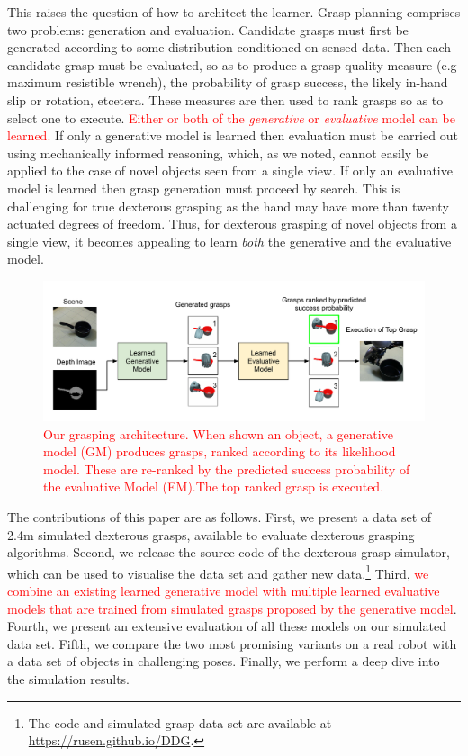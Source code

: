 This raises the question of how to architect the learner. Grasp planning comprises two problems: generation and evaluation. Candidate grasps must first be generated according to some distribution conditioned on sensed data. Then each candidate grasp must be evaluated, so as to produce a grasp quality measure (e.g maximum resistible wrench), the probability of grasp success, the likely in-hand slip or rotation, etcetera. These measures are then used to rank grasps so as to select one to execute. \textcolor{red}{Either or both of the {\em generative} or {\em evaluative} model can be learned.} If only a generative model is learned then evaluation must be carried out using mechanically informed reasoning, which, as we noted, cannot easily be applied to the case of novel objects seen from a single view. If only an evaluative model is learned then grasp generation must proceed by search. This is challenging for true dexterous grasping as the hand may have more than twenty actuated degrees of freedom. Thus, for dexterous grasping of novel objects from a single view, it becomes appealing to learn {\em both} the generative and the evaluative model. 
\begin{figure}[t]
\begin{center}
  \includegraphics[width=\columnwidth]{images/GEAarchitecture.pdf}
  \end{center}
  \caption{\textcolor{red}{Our grasping architecture. When shown an object, a generative model (GM) produces grasps, ranked according to its likelihood model. These are re-ranked by the predicted success probability of the evaluative Model (EM).The top ranked grasp is executed.}}
\label{fig:systemArchitecture}
\end{figure}

The contributions of this paper are as follows. First, we present a data set of 2.4m simulated dexterous grasps, available to evaluate dexterous grasping algorithms. Second, we release the source code of the dexterous grasp simulator, which can be used to visualise the data set and gather new data.\footnote{The code and simulated grasp data set are available at \href{https://rusen.github.io/DDG}{https://rusen.github.io/DDG}.} Third, \textcolor{red}{we combine an existing learned generative model with multiple learned evaluative models that are trained from simulated grasps proposed by the generative model}. Fourth, we present an extensive evaluation of all these models on our simulated data set. Fifth, we compare the two most promising variants on a real robot with a data set of objects in challenging poses. Finally, we perform a deep dive into the simulation results.

